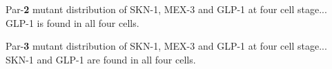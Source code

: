 \begin{flashcard}{Par-\textbf{2} mutant distribution of SKN-1, MEX-3 and GLP-1 at four cell stage...}
    GLP-1 is found in all four cells. 
\end{flashcard}

\begin{flashcard}{Par-\textbf{3} mutant distribution of SKN-1, MEX-3 and GLP-1 at four cell stage...}
    SKN-1 and GLP-1 are found in all four cells.
\end{flashcard}
